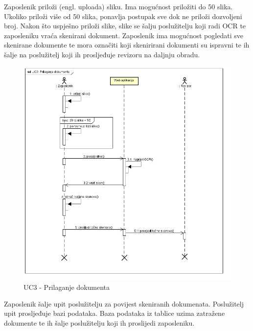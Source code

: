 			\pagebreak
			Zaposlenik priloži (engl. uploada) sliku. Ima mogućnost priložiti do 50 slika. Ukoliko priloži više od 50 slika, ponavlja postupak sve dok ne priloži dozvoljeni broj. Nakon što uspješno priloži slike, slike se šalju poslužitelju koji radi OCR te zaposleniku vraća skenirani dokument. Zaposlenik ima mogućnost pogledati sve skenirane dokumente te mora označiti koji skenirirani dokumenti su ispravni te ih šalje na poslužitelj koji ih prosljeđuje revizoru na daljnju obradu.
			\begin{figure}[H]
				\includegraphics[scale=0.8]{slike/UC3 - Prilaganje dokumenta.png} %
				\centering
				\caption{UC3 - Prilaganje dokumenta}
				\label{uc3}
			\end{figure}
		\pagebreak
		Zaposlenik šalje upit poslužitelju za povijest skeniranih dokumenata. Poslužitelj upit prosljeđuje bazi podataka. Baza podataka iz tablice uzima zatražene dokumente te ih šalje poslužitelju koji ih proslijedi zaposleniku.
